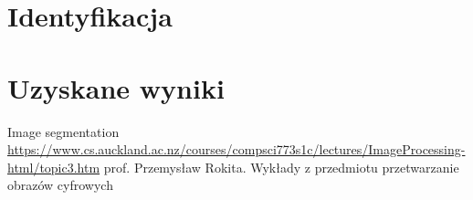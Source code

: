 \documentclass[11pt,a4paper,twoside]{article}
\begin{document}
\section{Identyfikacja}


\section{Uzyskane wyniki}


\newpage





\begin{thebibliography}{9}
Image segmentation
\url{https://www.cs.auckland.ac.nz/courses/compsci773s1c/lectures/ImageProcessing-html/topic3.htm}
prof. Przemysław Rokita. Wykłady z przedmiotu przetwarzanie obrazów cyfrowych

\end{thebibliography}
\end{document}
